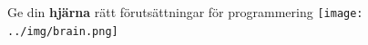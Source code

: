 
\fi


\ifkompendium\else
\begin{SlideExtra}{Ge din \textbf{hjärna} rätt förutsättningar för programmering}
  \texttt{[image: ../img/brain.png]}
\end{SlideExtra}
\fi
  
